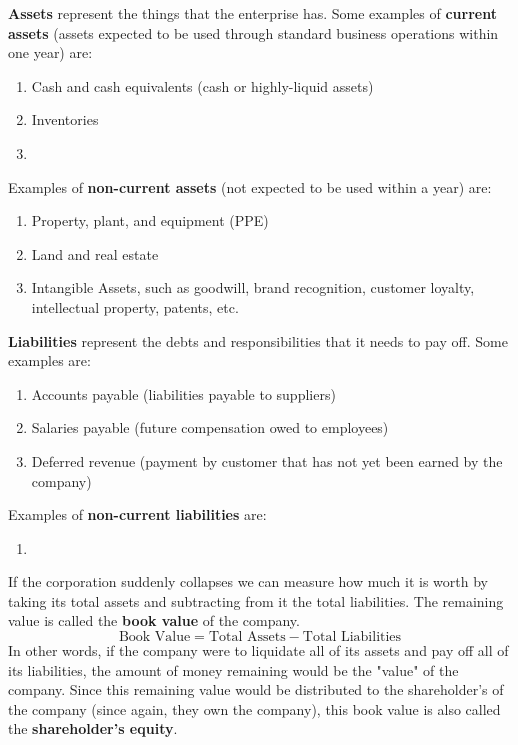 \documentclass{article}
\begin{document}
    \begin{definition}[Assets]
      \label{def:assets}
      \textbf{Assets} represent the things that the enterprise has. Some examples of \textbf{current assets} (assets expected to be used through standard business operations within one year) are: 
      \begin{enumerate}
        \item Cash and cash equivalents (cash or highly-liquid assets)
        \item Inventories
        \item
      \end{enumerate}
      Examples of \textbf{non-current assets} (not expected to be used within a year) are: 
      \begin{enumerate}
        \item Property, plant, and equipment (PPE)
        \item Land and real estate
        \item Intangible Assets, such as goodwill, brand recognition, customer loyalty, intellectual property, patents, etc. 
      \end{enumerate}
    \end{definition}

    \begin{definition}[Liabilities]
      \label{def:liabilities}
      \textbf{Liabilities} represent the debts and responsibilities that it needs to pay off. Some examples are: 
      \begin{enumerate}
        \item Accounts payable (liabilities payable to suppliers) 
        \item Salaries payable (future compensation owed to employees)
        \item Deferred revenue (payment by customer that has not yet been earned by the company) 
      \end{enumerate}
      Examples of \textbf{non-current liabilities} are: 
      \begin{enumerate}
          \item 
      \end{enumerate}
    \end{definition}

    \begin{definition}
      \label{def:shareholders-equity-or-book-value}
      If the corporation suddenly collapses we can measure how much it is worth by taking its total assets and subtracting from it the total liabilities. The remaining value is called the \textbf{book value} of the company. 
      \begin{equation}
        \text{Book Value} = \text{Total Assets} - \text{Total Liabilities}
      \end{equation}
      In other words, if the company were to liquidate all of its assets and pay off all of its liabilities, the amount of money remaining would be the "value" of the company. Since this remaining value would be distributed to the shareholder's of the company (since again, they own the company), this book value is also called the \textbf{shareholder's equity}. 
    \end{definition}
\end{document}
